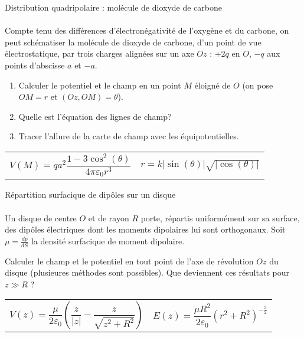 \documentclass[french, a4paper, 11pt]{article}
\newcommand{\po}{\left(}         %
\newcommand{\pf}{\right)}        %
\newcommand{\pof}[1]{\po #1 \pf} %
\begin{document}
\begin{cadre}{Distribution quadripolaire : molécule de dioxyde de carbone}
  \paragraph*{}
  Compte tenu des différences d'électronégativité de l'oxygène et du carbone, on peut schématiser la molécule de dioxyde de carbone, d'un point de vue électrostatique, par trois charges alignées sur un axe \(Oz\) : \(+2q\) en \(O\), \(-q\) aux points d'abscisse \(a\) et \(-a\).
  \begin{enumerate}[label=\upshape\alph*)]
    \item Calculer le potentiel et le champ en un point \(M\) éloigné de \(O\) (on pose \(OM=r\) et \((Oz, OM) = \theta\)).
    \item Quelle est l'équation des lignes de champ?
    \item Tracer l'allure de la carte de champ avec les équipotentielles.
  \end{enumerate}
  \tcblower
  \begin{tabularx}{\linewidth}{Xr}
    \(V(M) = qa^2\dfrac{1-3\cos^{2}(\theta)}{4\pi\varepsilon_{0}r^{3}}\) & \(r=k\lvert\sin(\theta)\rvert\sqrt{\lvert\cos(\theta)\rvert}\)
  \end{tabularx}
\end{cadre}

\begin{cadre}{Répartition surfacique de dipôles sur un disque}
  \paragraph*{}
  Un disque de centre \(O\) et de rayon \(R\) porte, répartis uniformément sur sa surface, des dipôles électriques dont les moments dipolaires lui sont orthogonaux. Soit \(\mu = \frac{dp}{dS}\) la densité surfacique de moment dipolaire.

  Calculer le champ et le potentiel en tout point de l'axe de révolution \(Oz\) du disque (plusieures méthodes sont possibles). Que deviennent ces résultats pour \(z\gg R\) ?
  \tcblower
  \begin{tabularx}{\linewidth}{Xr}
    \(V(z) = \dfrac{\mu}{2\varepsilon_{0}}\pof{\dfrac{z}{\lvert z\rvert}-\dfrac{z}{\sqrt{z^{2}+R^{2}}}}\) &
    \(E(z) = \dfrac{\mu R^{2}}{2\varepsilon_{0}}\pof{r^{2}+R^{2}}^{-\frac{3}{2}}\)
  \end{tabularx}
\end{cadre}
\end{document}
